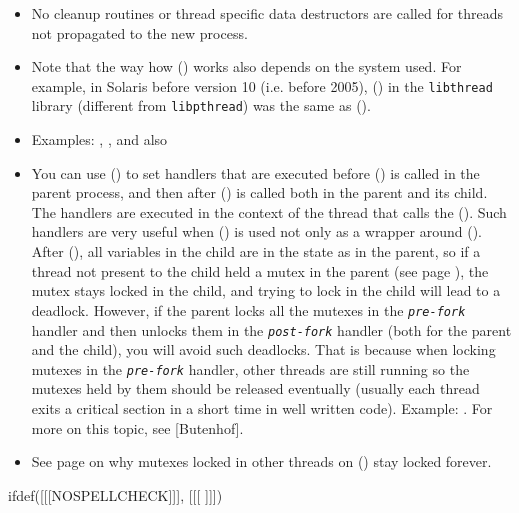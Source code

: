 \begin{itemize}
\item No cleanup routines or thread specific data destructors are called for
threads not propagated to the new process.
\item \label{FORKALL} Note that the way how () works also depends on
the system used.  For example, in Solaris before version 10 (i.e. before 2005),
() in the \texttt{libthread} library (different from
\texttt{libpthread}) was the same as ().
\item Examples: ,
, and also 
\item \label{ATFORK} You can use () to set handlers that
are executed before () is called in the parent process, and then after
() is called both in the parent and its child.  The handlers are
executed in the context of the thread that calls the ().  Such
handlers are very useful when () is used not only as a wrapper
around ().  After (), all variables in the child are in
the state as in the parent, so if a thread not present to the child held a mutex
in the parent (see page \pageref{MUTEXES}), the mutex stays locked in the child,
and trying to lock in the child will lead to a deadlock.  However, if the parent
locks all the mutexes in the \emph{\texttt{pre-fork}} handler and then unlocks
them in the \emph{\texttt{post-fork}} handler (both for the parent and the
child), you will avoid such deadlocks.  That is because when locking mutexes in
the \emph{\texttt{pre-fork}} handler, other threads are still running so the
mutexes held by them should be released eventually (usually each thread exits a
critical section in a short time in well written code).  Example:
.  For more on this topic, see [Butenhof].
\item See page \pageref{MUTEXES} on why mutexes locked in other threads on
() stay locked forever.
\end{itemize}


ifdef([[[NOSPELLCHECK]]], [[[
]]])

